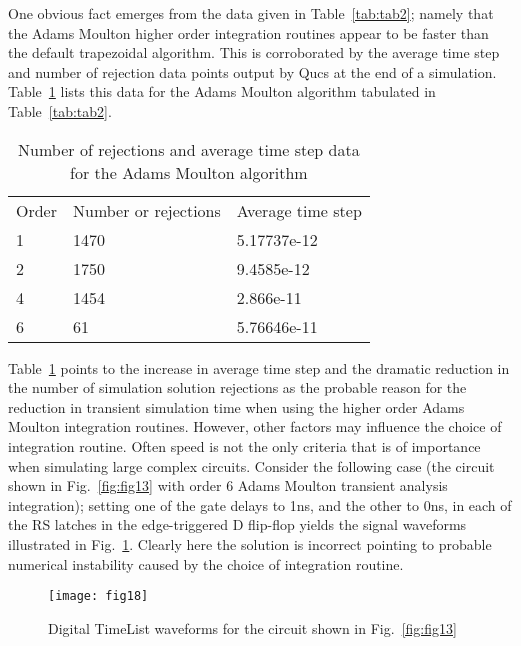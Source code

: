 One obvious fact emerges from the data given in Table~\ref{tab:tab2};
namely that the Adams Moulton higher order integration routines appear
to be faster than the default trapezoidal algorithm.  This is
corroborated by the average time step and number of rejection data
points output by Qucs at the end of a simulation. Table~\ref{tab:tab3}
lists this data for the Adams Moulton algorithm tabulated in
Table~\ref{tab:tab2}.
\begin{table}
\begin{center}
\begin{tabular}{lll}
Order & Number or rejections & Average time step \\ 
1 & 1470 & 5.17737e-12 \\ 
2 & 1750 & 9.4585e-12 \\ 
4 & 1454 & 2.866e-11 \\ 
6 & 61 & 5.76646e-11
\end{tabular}
\end{center}
\caption{Number of rejections and average time step data for the Adams Moulton algorithm}
\label{tab:tab3}
\end{table}

\addvspace{12pt}

Table~\ref{tab:tab3} points to the increase in average time step and
the dramatic reduction in the number of simulation solution rejections
as the probable reason for the reduction in transient simulation time
when using the higher order Adams Moulton integration routines.
However, other factors may influence the choice of integration
routine.  Often speed is not the only criteria that is of importance
when simulating large complex circuits.  Consider the following case
(the circuit shown in Fig.~\ref{fig:fig13} with order 6 Adams Moulton
transient analysis integration); setting one of the gate delays to
1ns, and the other to 0ns, in each of the RS latches in the
edge-triggered D flip-flop yields the signal waveforms illustrated in
Fig.~\ref{fig:fig18}. Clearly here the solution is incorrect pointing
to probable numerical instability caused by the choice of integration
routine.

\begin{figure}[ht]
  \centering
	\texttt{[image: fig18]}
        \caption{Digital TimeList waveforms for the circuit shown in Fig.~\ref{fig:fig13}}
        \label{fig:fig18}
\end{figure} 

